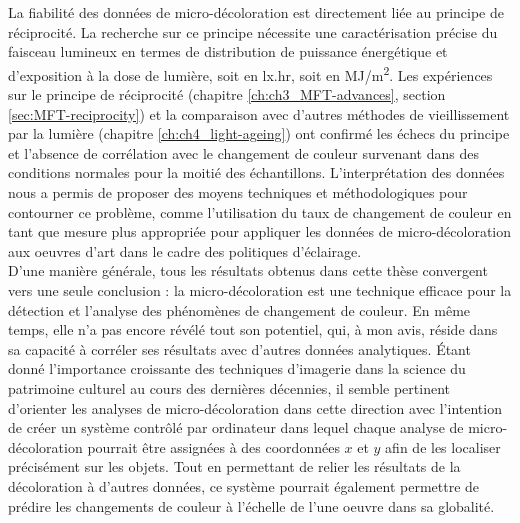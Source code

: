 La fiabilité des données de micro-décoloration est directement liée au principe de réciprocité. La recherche sur ce principe nécessite une caractérisation précise du faisceau lumineux en termes de distribution de puissance énergétique et d'exposition à la dose de lumière, soit en lx.hr, soit en MJ/m\textsuperscript{2}. Les expériences sur le principe de réciprocité (chapitre \ref{ch:ch3_MFT-advances}, section \ref{sec:MFT-reciprocity}) et la comparaison avec d'autres méthodes de vieillissement par la lumière (chapitre \ref{ch:ch4_light-ageing}) ont confirmé les échecs du principe et l'absence de corrélation avec le changement de couleur survenant dans des conditions normales pour la moitié des échantillons. L'interprétation des données nous a permis de proposer des moyens techniques et méthodologiques pour contourner ce problème, comme l'utilisation du taux de changement de couleur en tant que mesure plus appropriée pour appliquer les données de micro-décoloration aux oeuvres d'art dans le cadre des politiques d'éclairage.\\

D'une manière générale, tous les résultats obtenus dans cette thèse convergent vers une seule conclusion : la micro-décoloration est une technique efficace pour la détection et l'analyse des phénomènes de changement de couleur. En même temps, elle n'a pas encore révélé tout son potentiel, qui, à mon avis, réside dans sa capacité à corréler ses résultats avec d'autres données analytiques. Étant donné l'importance croissante des techniques d'imagerie dans la science du patrimoine culturel au cours des dernières décennies, il semble pertinent d'orienter les analyses de micro-décoloration dans cette direction avec l'intention de créer un système contrôlé par ordinateur dans lequel chaque analyse de micro-décoloration pourrait être assignées à des coordonnées $x$ et $y$ afin de les localiser précisément sur les objets. Tout en permettant de relier les résultats de la décoloration à d'autres données, ce système pourrait également permettre de prédire les changements de couleur à l'échelle de l'une oeuvre dans sa globalité.